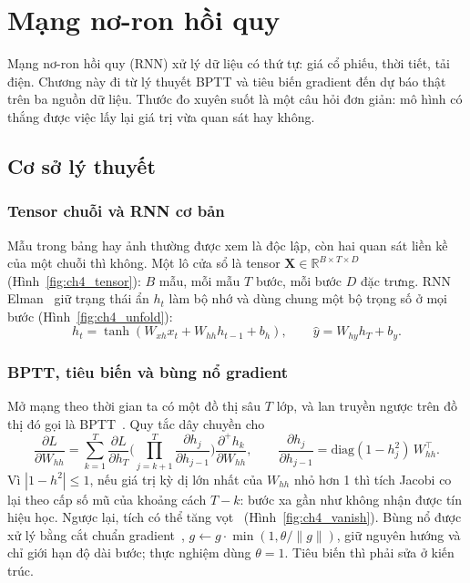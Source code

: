 \chapter{Mạng nơ-ron hồi quy}
\label{chap:rnn}

Mạng nơ-ron hồi quy (RNN) xử lý dữ liệu có thứ tự: giá cổ phiếu, thời tiết, tải điện. Chương này đi từ lý thuyết BPTT và tiêu biến gradient đến dự báo thật trên ba nguồn dữ liệu. Thước đo xuyên suốt là một câu hỏi đơn giản: mô hình có thắng được việc lấy lại giá trị vừa quan sát hay không.

\section{Cơ sở lý thuyết}

\subsection{Tensor chuỗi và RNN cơ bản}
Mẫu trong bảng hay ảnh thường được xem là độc lập, còn hai quan sát liền kề của một chuỗi thì không. Một lô cửa sổ là tensor $\mathbf{X}\in\mathbb{R}^{B\times T\times D}$ (Hình~\ref{fig:ch4_tensor}): $B$ mẫu, mỗi mẫu $T$ bước, mỗi bước $D$ đặc trưng. RNN Elman~\cite{elman1990} giữ trạng thái ẩn $h_t$ làm bộ nhớ và dùng chung một bộ trọng số ở mọi bước (Hình~\ref{fig:ch4_unfold}):
\begin{equation}
h_t=\tanh(W_{xh}x_t+W_{hh}h_{t-1}+b_h),\qquad \hat y=W_{hy}h_T+b_y .
\end{equation}


\subsection{BPTT, tiêu biến và bùng nổ gradient}
Mở mạng theo thời gian ta có một đồ thị sâu $T$ lớp, và lan truyền ngược trên đồ thị đó gọi là BPTT~\cite{werbos1990}. Quy tắc dây chuyền cho
\begin{equation}
\frac{\partial L}{\partial W_{hh}}=\sum_{k=1}^{T}\frac{\partial L}{\partial h_T}\Big(\prod_{j=k+1}^{T}\frac{\partial h_j}{\partial h_{j-1}}\Big)\frac{\partial^{+} h_k}{\partial W_{hh}},
\qquad \frac{\partial h_j}{\partial h_{j-1}}=\mathrm{diag}(1-h_j^2)\,W_{hh}^{\top}.
\end{equation}
Vì $|1-h^2|\le 1$, nếu giá trị kỳ dị lớn nhất của $W_{hh}$ nhỏ hơn 1 thì tích Jacobi co lại theo cấp số mũ của khoảng cách $T-k$: bước xa gần như không nhận được tín hiệu học. Ngược lại, tích có thể tăng vọt~\cite{bengio1994} (Hình~\ref{fig:ch4_vanish}). Bùng nổ được xử lý bằng cắt chuẩn gradient~\cite{pascanu2013}, $g\leftarrow g\cdot\min(1,\theta/\|g\|)$, giữ nguyên hướng và chỉ giới hạn độ dài bước; thực nghiệm dùng $\theta=1$. Tiêu biến thì phải sửa ở kiến trúc.

